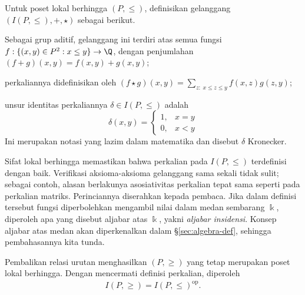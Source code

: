 Untuk poset lokal berhingga $(P, \leq)$, definisikan gelanggang $(I(P, \leq),+,\star)$ sebagai berikut.
\begin{compactitem}
	\item Sebagai grup aditif, gelanggang ini terdiri atas semua fungsi $f: \{(x,y) \in P^2 : x \leq y \} \to \Q$, dengan penjumlahan \linebreak $(f+g)(x,y) = f(x,y) + g(x,y)$;
	\item perkaliannya didefinisikan oleh $(f \star g)(x,y) = \sum_{z: \; x \leq z \leq y} f(x,z) g(z,y)$;
	\item unsur identitas perkaliannya $\delta \in I(P, \leq)$ adalah
	\[ \delta(x,y) = \begin{cases} 1, & x=y \\ 0, & x < y \end{cases} \]
	Ini merupakan notasi yang lazim dalam matematika dan disebut $\delta$ Kronecker. 
\end{compactitem}
Sifat lokal berhingga memastikan bahwa perkalian pada $I(P, \leq)$ terdefinisi dengan baik. Verifikasi aksioma-aksioma gelanggang sama sekali tidak sulit; sebagai contoh, alasan berlakunya asosiativitas perkalian tepat sama seperti pada perkalian matriks. Perinciannya diserahkan kepada pembaca. Jika dalam definisi tersebut fungsi diperbolehkan mengambil nilai dalam medan sembarang $\Bbbk$, diperoleh apa yang disebut aljabar atas $\Bbbk$, yakni \emph{aljabar insidensi}. Konsep aljabar atas medan akan diperkenalkan dalam \S\ref{sec:algebra-def}, sehingga pembahasannya kita tunda.

Pembalikan relasi urutan menghasilkan $(P, \geq)$ yang tetap merupakan poset lokal berhingga. Dengan mencermati definisi perkalian, diperoleh
\begin{gather}\label{eqn:incidence-ring-op}
	I(P,\geq) = I(P, \leq)^\text{op}.
\end{gather}

